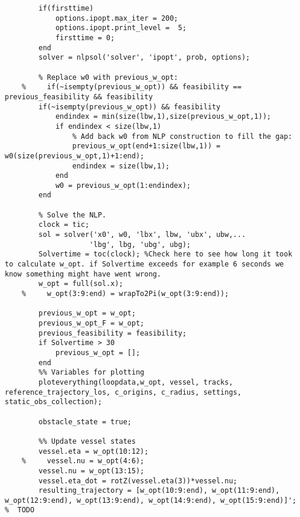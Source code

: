 \begin{lstlisting}
        if(firsttime)
            options.ipopt.max_iter = 200;
            options.ipopt.print_level =  5;
            firsttime = 0;
        end
        solver = nlpsol('solver', 'ipopt', prob, options);
    
        % Replace w0 with previous_w_opt:
    %     if(~isempty(previous_w_opt)) && feasibility == previous_feasibility && feasibility
        if(~isempty(previous_w_opt)) && feasibility
            endindex = min(size(lbw,1),size(previous_w_opt,1));
            if endindex < size(lbw,1)
                % Add back w0 from NLP construction to fill the gap:
                previous_w_opt(end+1:size(lbw,1)) = w0(size(previous_w_opt,1)+1:end);
                endindex = size(lbw,1);
            end
            w0 = previous_w_opt(1:endindex);
        end
        
        % Solve the NLP.
        clock = tic;
        sol = solver('x0', w0, 'lbx', lbw, 'ubx', ubw,...
                    'lbg', lbg, 'ubg', ubg);
        Solvertime = toc(clock); %Check here to see how long it took to calculate w_opt. if Solvertime exceeds for example 6 seconds we know something might have went wrong.
        w_opt = full(sol.x);
    %     w_opt(3:9:end) = wrapTo2Pi(w_opt(3:9:end));
        
        previous_w_opt = w_opt;
        previous_w_opt_F = w_opt;
        previous_feasibility = feasibility;
        if Solvertime > 30
            previous_w_opt = [];
        end
        %% Variables for plotting
        ploteverything(loopdata,w_opt, vessel, tracks, reference_trajectory_los, c_origins, c_radius, settings, static_obs_collection);
        
        obstacle_state = true;
        
        %% Update vessel states  
        vessel.eta = w_opt(10:12);
    %     vessel.nu = w_opt(4:6);
        vessel.nu = w_opt(13:15);
        vessel.eta_dot = rotZ(vessel.eta(3))*vessel.nu;
        resulting_trajectory = [w_opt(10:9:end), w_opt(11:9:end), w_opt(12:9:end), w_opt(13:9:end), w_opt(14:9:end), w_opt(15:9:end)]';     %  TODO
    
\end{lstlisting}